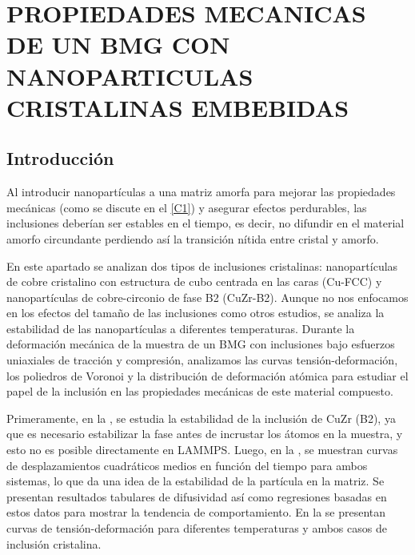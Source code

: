 
\chapter{PROPIEDADES MECANICAS DE UN BMG CON NANOPARTICULAS CRISTALINAS EMBEBIDAS} %

\label{C4} %


\section{Introducción}
Al introducir nanopartículas a una matriz amorfa para mejorar las propiedades mecánicas (como se discute en el \cref{C1}) y asegurar efectos perdurables, las inclusiones deberían ser estables en el tiempo, es decir, no difundir en el material amorfo circundante perdiendo así la transición nítida entre cristal y amorfo.

En este apartado se analizan dos tipos de inclusiones cristalinas: nanopartículas de cobre cristalino con estructura de cubo centrada en las caras (Cu-FCC) y nanopartículas de cobre-circonio de fase B2 (CuZr-B2). Aunque no nos enfocamos en los efectos del tamaño de las inclusiones como otros estudios, se analiza la estabilidad de las nanopartículas a diferentes temperaturas. Durante la deformación mecánica de la muestra de un BMG con inclusiones bajo esfuerzos uniaxiales de tracción y compresión, analizamos las curvas tensión-deformación, los poliedros de Voronoi y la distribución de deformación atómica para estudiar el papel de la inclusión en las propiedades mecánicas de este material compuesto.

Primeramente, en la , se estudia la estabilidad de la inclusión de CuZr (B2), ya que es necesario estabilizar la fase antes de incrustar los átomos en la muestra, y esto no es posible directamente en LAMMPS. Luego, en la , se muestran curvas de desplazamientos cuadráticos medios en función del tiempo para ambos sistemas, lo que da una idea de la estabilidad de la partícula en la matriz. Se presentan resultados tabulares de difusividad así como regresiones basadas en estos datos para mostrar la tendencia de comportamiento. En la  se presentan curvas de tensión-deformación para diferentes temperaturas y ambos casos de inclusión cristalina.

